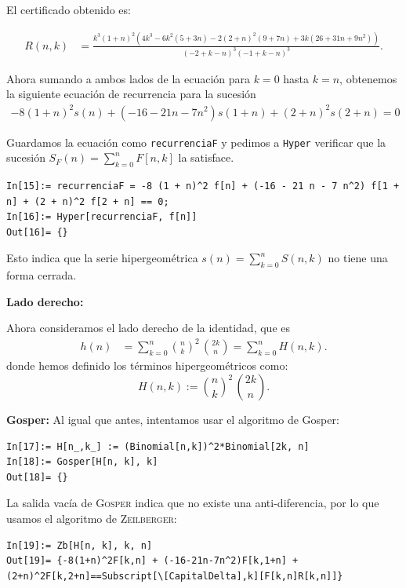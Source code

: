 \begin{solucion}
El certificado obtenido es:

\begin{align*}
  R(n,k) &= \frac{k^3(1+n)^2(4k^3-6k^2(5+3n) - 2(2+n)^2 (9+7n)+3k(26+31n+9n^2))}{(-2+k-n)^3(-1+k-n)^3}.
\end{align*}

Ahora sumando a ambos lados de la ecuación para $k=0$ hasta $k=n$, obtenemos la siguiente ecuación de recurrencia para la sucesión
\begin{align*}
    -8 (1+n)^2 s(n)+ (-16-21n-7n^2) s(1+n) + (2+n)^2 s(2+n) = 0
\end{align*}

Guardamos la ecuación como \texttt{recurrenciaF} y pedimos a \texttt{Hyper} verificar que la sucesión
$S_F(n)=\sum_{k=0}^{n} F[n,k]$ la satisface.

\begin{lstlisting}[caption={Verificación automática de la recurrencia}]
In[15]:= recurrenciaF = -8 (1 + n)^2 f[n] + (-16 - 21 n - 7 n^2) f[1 + n] + (2 + n)^2 f[2 + n] == 0;
In[16]:= Hyper[recurrenciaF, f[n]]
Out[16]= {}
\end{lstlisting}

Esto indica que la serie hipergeométrica $s(n)=\sum_{k=0}^{n} S(n,k)$ no tiene una forma cerrada.

\textbf{Lado derecho:}

Ahora consideramos el lado derecho de la identidad, que es
\begin{align*}
  h(n) &= \sum_{k=0}^{n} \binom{n}{k}^2 \,\binom{2k}{n} = \sum_{k=0}^{n} H(n,k).
\end{align*}
donde hemos definido los términos hipergeométricos como:
\[
  H(n,k) := \binom{n}{k}^{2}\,\binom{2k}{n}.
\]

\textbf{Gosper:} Al igual que antes, intentamos usar el algoritmo de Gosper:
\begin{lstlisting}[caption={Definición de \texttt{H} y aplicación de Gosper}]
In[17]:= H[n_,k_] := (Binomial[n,k])^2*Binomial[2k, n]
In[18]:= Gosper[H[n, k], k]
Out[18]= {}
\end{lstlisting}

La salida vacía de \textsc{Gosper} indica que no existe una anti-diferencia, por lo que usamos el algoritmo de \textsc{Zeilberger}:

\begin{lstlisting}[caption={Recurrencia para el lado derecho}]
In[19]:= Zb[H[n, k], k, n]
Out[19]= {-8(1+n)^2F[k,n] + (-16-21n-7n^2)F[k,1+n] + (2+n)^2F[k,2+n]==Subscript[\[CapitalDelta],k][F[k,n]R[k,n]]}
\end{lstlisting}


\end{solucion}
